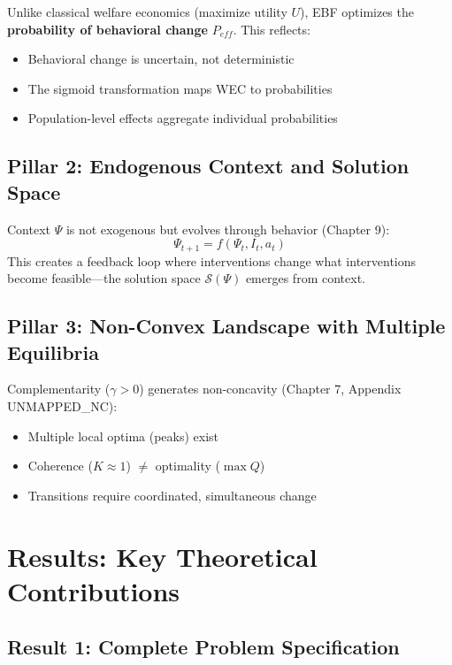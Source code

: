 Unlike classical welfare economics (maximize utility $U$), EBF optimizes the
\textbf{probability of behavioral change} $P_{eff}$. This reflects:
\begin{itemize}
\item Behavioral change is uncertain, not deterministic
\item The sigmoid transformation maps WEC to probabilities
\item Population-level effects aggregate individual probabilities
\end{itemize}

\subsection{Pillar 2: Endogenous Context and Solution Space}

Context $\Psi$ is not exogenous but evolves through behavior (Chapter 9):
\[
\Psi_{t+1} = f(\Psi_t, I_t, a_t)
\]
This creates a feedback loop where interventions change what interventions
become feasible---the solution space $\mathcal{S}(\Psi)$ emerges from context.

\subsection{Pillar 3: Non-Convex Landscape with Multiple Equilibria}

Complementarity ($\gamma > 0$) generates non-concavity (Chapter 7, Appendix UNMAPPED_NC):
\begin{itemize}
\item Multiple local optima (peaks) exist
\item Coherence ($K \approx 1$) $\neq$ optimality ($\max Q$)
\item Transitions require coordinated, simultaneous change
\end{itemize}

\section{Results: Key Theoretical Contributions}
\label{sec:mp-results}

\subsection{Result 1: Complete Problem Specification}

